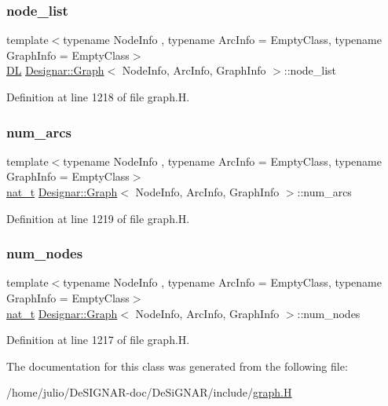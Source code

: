 \subsubsection{\texorpdfstring{node\+\_\+list}{node\_list}}
{\footnotesize\ttfamily template$<$typename Node\+Info , typename Arc\+Info  = Empty\+Class, typename Graph\+Info  = Empty\+Class$>$ \\
\hyperlink{class_designar_1_1_d_l}{DL} \hyperlink{class_designar_1_1_graph}{Designar\+::\+Graph}$<$ Node\+Info, Arc\+Info, Graph\+Info $>$\+::node\+\_\+list\hspace{0.3cm}{\ttfamily [protected]}}



Definition at line 1218 of file graph.\+H.

\mbox{\label{class_designar_1_1_graph_a035a0debf7a7545d0033f37cf941020f}} 
\subsubsection{\texorpdfstring{num\+\_\+arcs}{num\_arcs}}
{\footnotesize\ttfamily template$<$typename Node\+Info , typename Arc\+Info  = Empty\+Class, typename Graph\+Info  = Empty\+Class$>$ \\
\hyperlink{namespace_designar_aa72662848b9f4815e7bf31a7cf3e33d1}{nat\+\_\+t} \hyperlink{class_designar_1_1_graph}{Designar\+::\+Graph}$<$ Node\+Info, Arc\+Info, Graph\+Info $>$\+::num\+\_\+arcs\hspace{0.3cm}{\ttfamily [protected]}}



Definition at line 1219 of file graph.\+H.

\mbox{\label{class_designar_1_1_graph_a1ff2ba87ab27911b1f6d47e622e67542}} 
\subsubsection{\texorpdfstring{num\+\_\+nodes}{num\_nodes}}
{\footnotesize\ttfamily template$<$typename Node\+Info , typename Arc\+Info  = Empty\+Class, typename Graph\+Info  = Empty\+Class$>$ \\
\hyperlink{namespace_designar_aa72662848b9f4815e7bf31a7cf3e33d1}{nat\+\_\+t} \hyperlink{class_designar_1_1_graph}{Designar\+::\+Graph}$<$ Node\+Info, Arc\+Info, Graph\+Info $>$\+::num\+\_\+nodes\hspace{0.3cm}{\ttfamily [protected]}}



Definition at line 1217 of file graph.\+H.



The documentation for this class was generated from the following file\+:\begin{DoxyCompactItemize}
\item 
/home/julio/\+De\+S\+I\+G\+N\+A\+R-\/doc/\+De\+Si\+G\+N\+A\+R/include/\hyperlink{graph_8_h}{graph.\+H}\end{DoxyCompactItemize}
